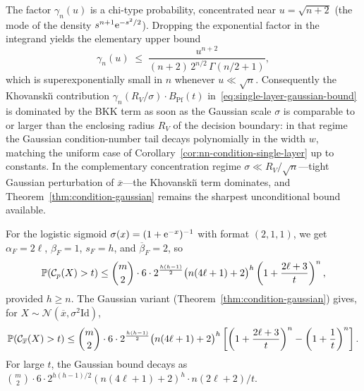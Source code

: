 \begin{remark}\label{rem:gaussian-concentration-regime}
  The factor $\gamma_n(u)$ is a chi-type probability, concentrated near $u = \sqrt{n+2}$ (the mode of the density $s^{n+1}\mathrm{e}^{-s^2/2}$). Dropping the exponential factor in the integrand yields the elementary upper bound
  \begin{equation*}
    \gamma_n(u) \;\leq\; \frac{u^{n+2}}{(n+2)\,2^{n/2}\,\Gamma(n/2+1)},
  \end{equation*}
  which is superexponentially small in $n$ whenever $u \ll \sqrt n$. Consequently the Khovanski\u\i{} contribution $\gamma_n(R_V/\sigma)\cdot B_{\mathrm{Pf}}(t)$ in~\eqref{eq:single-layer-gaussian-bound} is dominated by the BKK term as soon as the Gaussian scale $\sigma$ is comparable to or larger than the enclosing radius $R_V$ of the decision boundary: in that regime the Gaussian condition-number tail decays polynomially in the width $w$, matching the uniform case of Corollary~\ref{cor:nn-condition-single-layer} up to constants. In the complementary concentration regime $\sigma \ll R_V/\sqrt n$---tight Gaussian perturbation of $\overline x$---the Khovanski\u\i{} term dominates, and Theorem~\ref{thm:condition-gaussian} remains the sharpest unconditional bound available.
\end{remark}

\begin{example}\label{ex:sigmoid-condition}
For the logistic sigmoid $\sigma(x) = (1+\mathrm{e}^{-x})^{-1}$ with format $(2,1,1)$, we get $\alpha_F = 2\ell$, $\beta_F = 1$, $s_F = h$, and $\overline{\beta}_F = 2$, so
\begin{equation*}
  \mathbb{P}(\mathcal{C}_p(X) > t) \leq \binom{m}{2}\cdot 6\cdot 2^{\frac{h(h-1)}{2}}\big(n(4\ell+1)+2\big)^h\left(1+\frac{2\ell+3}{t}\right)^n,
\end{equation*}
provided $h\geq n$. The Gaussian variant (Theorem~\ref{thm:condition-gaussian}) gives, for $X\sim \mathcal{N}(\overline{x}, \sigma^2\mathrm{Id})$,
\begin{equation*}
  \mathbb{P}(\mathcal{C}_{\overline{x}}(X) > t) \leq \binom{m}{2}\cdot 6\cdot 2^{\frac{h(h-1)}{2}}\big(n(4\ell+1)+2\big)^h\left[\left(1+\frac{2\ell+3}{t}\right)^n - \left(1+\frac{1}{t}\right)^n\right].
\end{equation*}
For large $t$, the Gaussian bound decays as $\binom{m}{2}\cdot 6\cdot 2^{h(h-1)/2}(n(4\ell+1)+2)^h \cdot n(2\ell+2)/t$.
\end{example}

